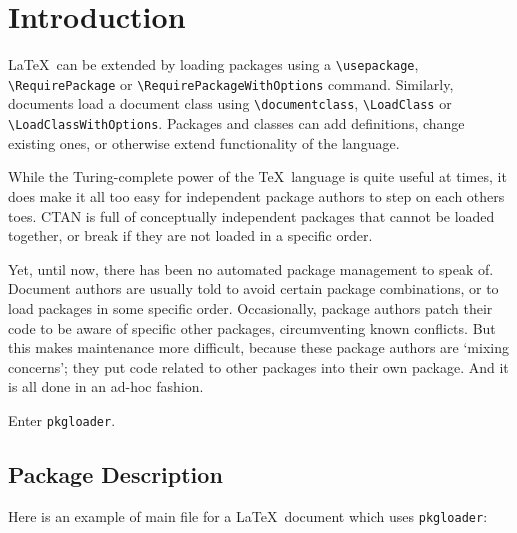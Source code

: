 \documentclass[a4paper]{pkgloader-packagedoc}
\begin{document}

\maketitle

\section {Introduction}  %

\LaTeX\ can be extended by loading packages
using a \lstinline+\usepackage+, \lstinline+\RequirePackage+
or \lstinline+\RequirePackageWithOptions+ command. Similarly, documents load
a document class using \lstinline+\documentclass+, \lstinline+\LoadClass+
or \lstinline+\LoadClassWithOptions+.
Packages and classes can add definitions, change existing ones,
or otherwise extend functionality of the language.

While the Turing-complete power of the \TeX\ language is quite useful at times,
it does make it all too easy for independent package authors to step on each
others toes. CTAN is full of conceptually independent packages that cannot be
loaded together, or break if they are not loaded in a specific order.

Yet, until now, there has been no automated package management to speak of.
Document authors are usually told to avoid certain package combinations,
or to load packages in some specific order.
Occasionally, package authors patch their code to be aware of specific
other packages, circumventing known conflicts.
But this makes maintenance more difficult, because these package authors
are `mixing concerns'; they put code related to other packages into their
own package. And it is all done in an ad-hoc fashion.

Enter \lstinline+pkgloader+.



\subsection {Package Description} %

Here is an example of main file for a \LaTeX\ document
which uses \lstinline+pkgloader+:
\end{document}
